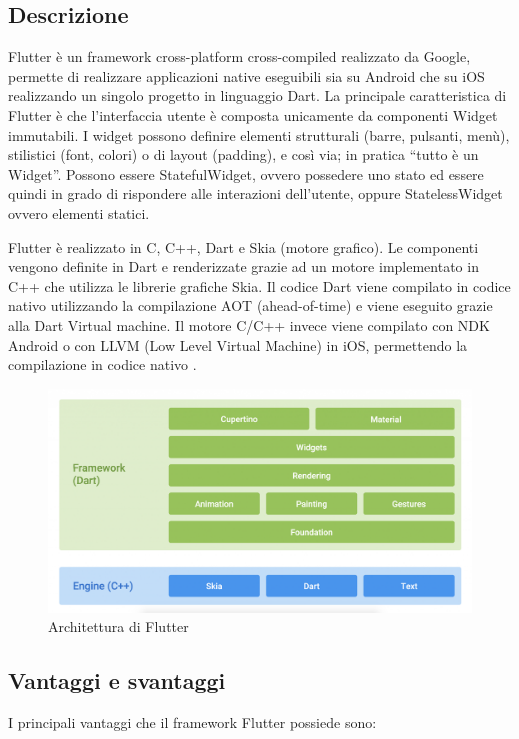 \subsection{Descrizione\label{sec:flutter-descrizione}}
Flutter è un framework cross-platform cross-compiled realizzato da Google, permette di realizzare applicazioni native eseguibili sia su Android che su iOS realizzando un singolo progetto in linguaggio Dart. La principale caratteristica di Flutter è che l'interfaccia utente è composta unicamente da componenti Widget immutabili. I widget possono definire elementi strutturali (barre, pulsanti, menù), stilistici (font, colori) o di layout (padding), e così via; in pratica ``tutto è un Widget''. Possono essere StatefulWidget, ovvero possedere uno stato ed essere quindi in grado di rispondere alle interazioni dell'utente, oppure StatelessWidget ovvero elementi statici.

Flutter è realizzato in C, C++, Dart e Skia (motore grafico). Le componenti vengono definite in Dart e renderizzate grazie ad un motore implementato in C++ che utilizza le librerie grafiche Skia. Il codice Dart viene compilato in codice nativo utilizzando la compilazione AOT (ahead-of-time) e viene eseguito grazie alla Dart Virtual machine. Il motore C/C++ invece viene compilato con NDK Android o con LLVM (Low Level Virtual Machine) in iOS, permettendo la compilazione in codice nativo \parencite{flutter:presentazione}.

\begin{figure}[htp]
	\centering
	\includegraphics[width=\linewidth]{./immagini/flutter_architecture.png}
	\caption{Architettura di Flutter}
\end{figure}

\subsection{Vantaggi e svantaggi\label{sec:flutter-vantaggi}}
I principali vantaggi che il framework Flutter possiede sono:

